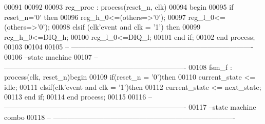 \begin{DoxyCode}
00091             
00092  
00093  reg\_proc : \textcolor{keywordflow}{process}(reset_n, clk)
00094 \textcolor{vhdlkeyword}{    begin}
00095       \textcolor{keywordflow}{if} \textcolor{vhdlchar}{reset_n}\textcolor{vhdlchar}{=}\textcolor{vhdlchar}{'}\textcolor{vhdllogic}{}\textcolor{vhdllogic}{0}\textcolor{vhdlchar}{'} \textcolor{keywordflow}{then}
00096             reg\_h\_0<=(others=>'0');
00097          reg\_l\_0<=(others=>'0');
00098       \textcolor{keywordflow}{elsif} \textcolor{vhdlchar}{(}\textcolor{vhdlchar}{clk}\textcolor{vhdlchar}{'}\textcolor{vhdlkeyword}{event} \textcolor{keywordflow}{and} \textcolor{vhdlchar}{clk} \textcolor{vhdlchar}{=} \textcolor{vhdlchar}{'}\textcolor{vhdllogic}{}\textcolor{vhdllogic}{1}\textcolor{vhdlchar}{'}\textcolor{vhdlchar}{)} \textcolor{keywordflow}{then}
00099             reg\_h\_0<=DIQ\_h; 
00100          reg\_l\_0<=DIQ\_l; 
00101         \textcolor{keywordflow}{end} \textcolor{keywordflow}{if};
00102     \textcolor{keywordflow}{end} \textcolor{keywordflow}{process};
00103     
00104     
00105 \textcolor{keyword}{-- ----------------------------------------------------------------------------}
00106 \textcolor{keyword}{--state machine}
00107 \textcolor{keyword}{-- ----------------------------------------------------------------------------}
00108 fsm\_f : \textcolor{keywordflow}{process}(clk, reset_n)\textcolor{keywordflow}{begin}
00109     \textcolor{keywordflow}{if}\textcolor{vhdlchar}{(}\textcolor{vhdlchar}{reset_n} \textcolor{vhdlchar}{=} \textcolor{vhdlchar}{'}\textcolor{vhdllogic}{}\textcolor{vhdllogic}{0}\textcolor{vhdlchar}{'}\textcolor{vhdlchar}{)}\textcolor{keywordflow}{then}
00110         \textcolor{vhdlchar}{current_state} \textcolor{vhdlchar}{<=} \textcolor{vhdlchar}{idle};
00111     \textcolor{keywordflow}{elsif}\textcolor{vhdlchar}{(}\textcolor{vhdlchar}{clk}\textcolor{vhdlchar}{'}\textcolor{vhdlkeyword}{event} \textcolor{keywordflow}{and} \textcolor{vhdlchar}{clk} \textcolor{vhdlchar}{=} \textcolor{vhdlchar}{'}\textcolor{vhdllogic}{}\textcolor{vhdllogic}{1}\textcolor{vhdlchar}{'}\textcolor{vhdlchar}{)}\textcolor{keywordflow}{then} 
00112         \textcolor{vhdlchar}{current_state} \textcolor{vhdlchar}{<=} \textcolor{vhdlchar}{next_state};
00113     \textcolor{keywordflow}{end} \textcolor{keywordflow}{if}; 
00114 \textcolor{keywordflow}{end} \textcolor{keywordflow}{process};
00115 
00116 \textcolor{keyword}{-- ----------------------------------------------------------------------------}
00117 \textcolor{keyword}{--state machine combo}
00118 \textcolor{keyword}{-- ----------------------------------------------------------------------------}

\end{DoxyCode}
